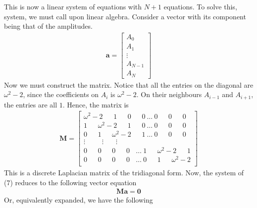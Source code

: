 \documentclass{article}
\newcommand{\ve}{\mathbf}
\begin{document}
This is now a linear system of equations with $N+1$ equations. 
To solve this, system, we must call upon linear algebra. Consider a vector with its component 
being that of the amplitudes. 
\begin{align}
    \ve{a}=
    \begin{bmatrix}
        A_0\\ 
        A_1\\ 
        \vdots\\ 
        A_{N-1}\\
        A_N
    \end{bmatrix}
\end{align}
Now we must construct the matrix. Notice that all the entries on the diagonal are 
$\omega^2-2$, since the coefficients on $A_i$ is $\omega^2-2$. On their neighbours $A_{i-1}$ and $A_{i+1}$, 
the entries are all $1$. Hence, the matrix is 
\begin{align}
    \ve{M}=\begin{bmatrix}
        \omega^2-2\ \ \ \ \ \ \  1\ \ \ \ \ \ \ 0\ \ \ \ \ \ \ 0\ \dots\ 0\ \ \ \ \ \ \ 0\ \ \ \ \ \ \ 0\\ 
        1\ \ \ \ \ \ \ \omega^2-2\ \ \ \ \ \ \ 1 \ \ \ \ \ \ \ 0\ \dots\ 0\ \ \ \ \ \ \ 0\ \ \ \ \ \ \ 0\\
        0\ \ \ \ \ \ \ 1\ \ \ \ \ \ \ \omega^2-2 \ \ \ \ \ \ \ 1\ \dots\ 0\ \ \ \ \ \ \ 0\ \ \ \ \ \ \ 0\\
        \vdots\ \ \ \ \  \ \ \ \ \ \ \vdots \ \ \  \ \ \ \ \ \vdots \\ 
        0\ \ \ \ \ \ \ 0\ \ \ \ \ \ \ 0 \ \ \ \ \ \ \ 0 \ \ \ \ \dots\ 1\ \ \ \ \ \ \ \omega^2-2\ \ \ \ \ \ \ 1\\
        0\ \ \ \ \ \ \ 0\ \ \ \ \ \ \ 0 \ \ \ \ \ \ \ 0\ \ \ \ \dots\ 0\ \ \ \ \ \ \ 1\ \ \ \ \ \ \ \omega^2-2\\
    \end{bmatrix}
\end{align}
This is a discrete Laplacian matrix of the tridiagonal form. Now, the system of (7) reduces to the following vector equation 
\begin{align}
    \ve{M}\ve{a}=\ve{0}
\end{align}
Or, equivalently expanded, we have the following 
\end{document}

